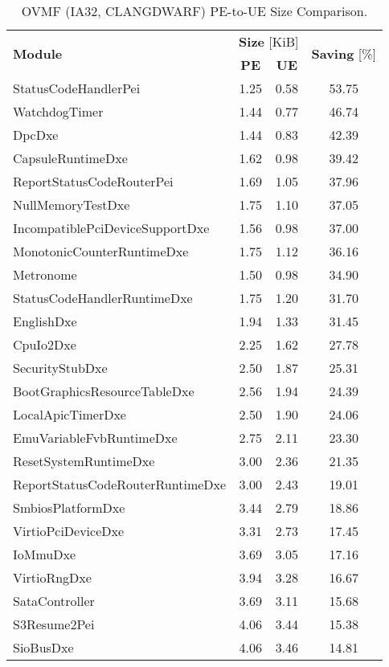 \begin{longtable}{l c c c}
  \caption{OVMF (IA32, CLANGDWARF) PE-to-UE Size Comparison.}\\\\
  \toprule
  \multirow{2}{*}[-2pt]{\textbf{Module}} & \multicolumn{2}{c}{\textbf{Size} [KiB]} & \multirow{2}{*}[-2pt]{\textbf{Saving} [\%]}\\
  \cmidrule{2-3}
  & \textbf{PE} & \textbf{UE} &\\
  \midrule
  StatusCodeHandlerPei & 1.25 & 0.58 & 53.75\\
  WatchdogTimer & 1.44 & 0.77 & 46.74\\
  DpcDxe & 1.44 & 0.83 & 42.39\\
  CapsuleRuntimeDxe & 1.62 & 0.98 & 39.42\\
  ReportStatusCodeRouterPei & 1.69 & 1.05 & 37.96\\
  NullMemoryTestDxe & 1.75 & 1.10 & 37.05\\
  IncompatiblePciDeviceSupportDxe & 1.56 & 0.98 & 37.00\\
  MonotonicCounterRuntimeDxe & 1.75 & 1.12 & 36.16\\
  Metronome & 1.50 & 0.98 & 34.90\\
  StatusCodeHandlerRuntimeDxe & 1.75 & 1.20 & 31.70\\
  EnglishDxe & 1.94 & 1.33 & 31.45\\
  CpuIo2Dxe & 2.25 & 1.62 & 27.78\\
  SecurityStubDxe & 2.50 & 1.87 & 25.31\\
  BootGraphicsResourceTableDxe & 2.56 & 1.94 & 24.39\\
  LocalApicTimerDxe & 2.50 & 1.90 & 24.06\\
  EmuVariableFvbRuntimeDxe & 2.75 & 2.11 & 23.30\\
  ResetSystemRuntimeDxe & 3.00 & 2.36 & 21.35\\
  ReportStatusCodeRouterRuntimeDxe & 3.00 & 2.43 & 19.01\\
  SmbiosPlatformDxe & 3.44 & 2.79 & 18.86\\
  VirtioPciDeviceDxe & 3.31 & 2.73 & 17.45\\
  IoMmuDxe & 3.69 & 3.05 & 17.16\\
  VirtioRngDxe & 3.94 & 3.28 & 16.67\\
  SataController & 3.69 & 3.11 & 15.68\\
  S3Resume2Pei & 4.06 & 3.44 & 15.38\\
  SioBusDxe & 4.06 & 3.46 & 14.81\\

\end{longtable}
